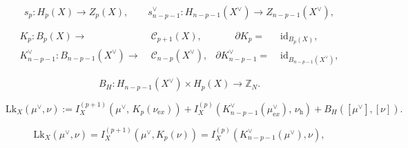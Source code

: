 \documentclass[10pt,a4paper]{amsart}
\newcommand{\Lk}{\mathrm{Lk}}
\begin{document}
	\begin{equation}
		s_p:H_p(X)\rightarrow Z_p(X),
		\qquad
		s^\vee_{n-p-1}:H_{n-p-1}(X^\vee)\rightarrow Z_{n-p-1}(X^\vee),
		\label{eq:sections}
	\end{equation}

	\begin{align}
		K_p:B_p(X)\rightarrow&\; \mathcal C_{p+1}(X),
		&\qquad
		\partial K_p=&\;\mathrm{id}_{B_p(X)},
		\label{eq:Kp}
	\\
		K^\vee_{n-p-1}:B_{n-p-1}(X^\vee)\rightarrow&\; \mathcal C_{n-p}(X^\vee),
		&
		\partial K^\vee_{n-p-1}=&\;\mathrm{id}_{B_{n-p-1}(X^\vee)},
		\label{eq:Kdual}
	\end{align}

	\begin{equation}
		B_H:H_{n-p-1}(X^\vee)\times H_p(X)\rightarrow \mathbb Z_N.
		\label{eq:BH}
	\end{equation}

\begin{equation}
	\Lk_X(\mu^\vee,\nu)
	:=
	I_X^{(p+1)}\left(\mu^\vee,\,K_p(\nu_{\mathrm ex})\right)
	+
	I_X^{(p)}\left(K^\vee_{n-p-1}(\mu^\vee_{\mathrm ex}),\,\nu_{\mathrm h}\right)
	+
	B_H\left([\mu^\vee],[\nu]\right).
	\label{eq:generalized-linking}
\end{equation}

\begin{equation}
	\Lk_X(\mu^\vee,\nu)
	=
	I_X^{(p+1)}\left(\mu^\vee,K_p(\nu)\right)
	=
	I_X^{(p)}\left(K^\vee_{n-p-1}(\mu^\vee),\nu\right),
	\label{eq:boundary-linking}
\end{equation}
\end{document}
